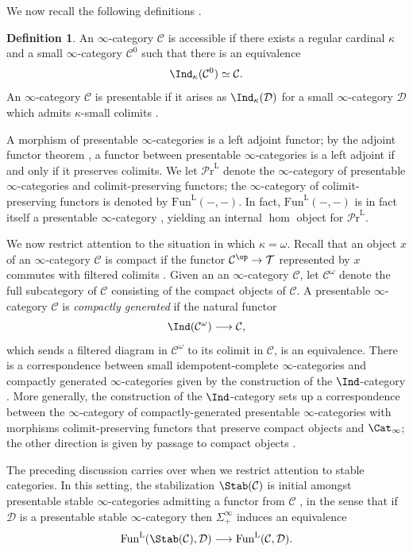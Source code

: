 \documentclass{amsart}
\newcommand{\htp}{\simeq}
\renewcommand{\to}{\mathchoice{\longrightarrow}{\rightarrow}{\rightarrow}{\rightarrow}}
\let\catsymbfont\mathcal
\newcommand{\aC}{{\catsymbfont{C}}}
\newcommand{\aD}{{\catsymbfont{D}}}
\newcommand{\aT}{{\catsymbfont{T}}}
\renewcommand{\L}{\mathrm{L}}
\newcommand{\icat}{\Cat_\i}
\newcommand{\prcat}{{\mathcal{P}\mathrm{r}}^\mathrm{L}}
\newcommand{\Fun}{\mathrm{Fun}} %
\renewcommand{\i}{\infty}
\numberwithin{equation}{section}
\theoremstyle{definition}
\newtheorem{definition}[equation]{Definition}
\begin{document}
We now recall the following definitions \cite[5.4.2.1,5.5.1.1]{HTT}.

\begin{definition}
An $\i$-category $\aC$ is accessible if there exists a regular
cardinal $\kappa$ and a small $\i$-category $\aC^{0}$ such that there
is an equivalence 
\[
\Ind_{\kappa}(\aC^{0}) \htp \aC.
\] 
An $\i$-category $\aC$ is presentable if it arises as
$\Ind_{\kappa}(\aD)$ for a small $\i$-category $\aD$ which admits
$\kappa$-small colimits \cite[5.5.1.1]{HTT}.  
\end{definition}

A morphism of presentable $\i$-categories is a left adjoint functor; by the adjoint functor theorem \cite[5.5.2.9]{HTT}, a functor between presentable $\i$-categories is a left adjoint if and only if it preserves colimits.  We let $\prcat$ denote the
$\i$-category of presentable $\i$-categories and colimit-preserving
functors; the $\i$-category of colimit-preserving functors is denoted
by $\Fun^{\L}(-,-)$.  In fact, $\Fun^{\L}(-,-)$ is in fact itself a
presentable $\i$-category \cite[5.5.3.8]{HTT}, yielding an
internal $\hom$ object for $\prcat$.

We now restrict attention to the situation in which $\kappa = \omega$.
Recall that an object $x$ of an $\i$-category $\aC$ is compact if the
functor $\aC^{\op}\to\aT$ represented by $x$ commutes with filtered
colimits \cite[\S 5.3.4]{HTT}.  Given an an
$\i$-category $\aC$, let $\aC^{\omega}$ denote the full subcategory of
$\aC$ consisting of the compact objects
of $\aC$.  A presentable $\i$-category $\aC$ is {\em compactly
  generated} if the natural functor
\[
\Ind(\aC^{\omega})\to\aC,
\]
which sends a filtered diagram in $\aC^\omega$ to its colimit in $\aC$,
is an equivalence.  There is a correspondence between small
idempotent-complete $\i$-categories and 
compactly generated $\i$-categories given by the construction of the
$\Ind$-category \cite[\S 5.5.7]{HTT}.
More generally, the construction of the
$\Ind$-category sets up a correspondence between the $\i$-category of
compactly-generated presentable $\i$-categories with morphisms
colimit-preserving functors that preserve compact objects and
$\icat$; the other direction is given by passage to
compact objects \cite[5.5.7.10]{HTT}.

The preceding discussion carries over when we restrict attention to
stable categories.  In this setting, the stabilization $\Stab(\aC)$ is
initial amongst presentable stable $\i$-categories admitting a
functor from $\aC$ \cite[1.4.5.5]{HAG}, in the sense that if $\aD$ is
a presentable stable $\i$-category then $\Sigma^\infty_+$ induces an
equivalence   
\[
\Fun^{\L}(\Stab(\aC), \aD) \to \Fun^{\L}(\aC, \aD). 
\]
\end{document}
